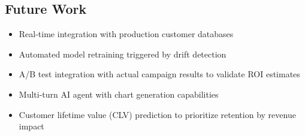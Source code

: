 \documentclass[11pt,a4paper]{article}
\begin{document}
\subsection{Future Work}

\begin{itemize}[leftmargin=*, label=\textcolor{graytext}{\faArrowRight}]
    \item Real-time integration with production customer databases
    \item Automated model retraining triggered by drift detection
    \item A/B test integration with actual campaign results to validate ROI estimates
    \item Multi-turn AI agent with chart generation capabilities
    \item Customer lifetime value (CLV) prediction to prioritize retention by revenue impact
\end{itemize}

\vfill
\begin{center}
\end{center}
\end{document}
